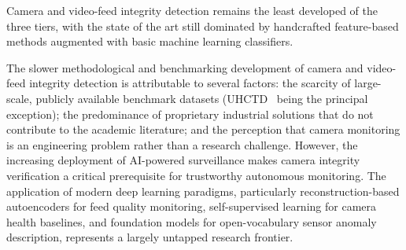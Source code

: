\documentclass[10pt,a4paper]{article}
\renewcommand{\arraystretch}{1.12}
\begin{document}
Camera and video-feed integrity detection remains the least developed of the three tiers, with the state of the art still dominated by handcrafted feature-based methods augmented with basic machine learning classifiers.

\begin{table}[!t]
\centering
\caption{Representative camera/video-feed-integrity evidence and its operational reporting. NR = not reported in the cited study.}
\label{tab:sota_camera}
\renewcommand{\arraystretch}{1.2}
\end{table}

The slower methodological and benchmarking development of camera and video-feed integrity detection is attributable to several factors: the scarcity of large-scale, publicly available benchmark datasets (UHCTD~\citep{mantini2019uhctd} being the principal exception); the predominance of proprietary industrial solutions that do not contribute to the academic literature; and the perception that camera monitoring is an engineering problem rather than a research challenge. However, the increasing deployment of AI-powered surveillance makes camera integrity verification a critical prerequisite for trustworthy autonomous monitoring. The application of modern deep learning paradigms, particularly reconstruction-based autoencoders for feed quality monitoring, self-supervised learning for camera health baselines, and foundation models for open-vocabulary sensor anomaly description, represents a largely untapped research frontier.
\end{document}
